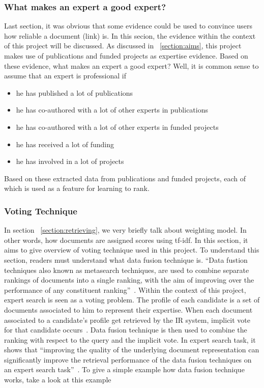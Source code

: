\subsubsection{What makes an expert a good expert?}\label{section:goodexpert}
Last section, it was obvious that some evidence could be used to convince users how reliable a document (link) is. In this secion, the evidence within
the context of this project will be discussed. As discussed in ~\ref{section:aims}, this project makes use of publications and funded projects as 
expertise evidence. Based on these evidence, what makes an expert a good expert? Well, it is common sense to assume that an expert is professional if 
\begin{itemize}
 \item he has published a lot of publications
 \item he has co-authored with a lot of other experts in publications
 \item he has co-authored with a lot of other experts in funded projects
 \item he has received a lot of funding
 \item he has involved in a lot of projects
\end{itemize}

Based on these extracted data from publications and funded projects, each of which is used as a feature for learning to rank.

\subsubsection{Voting Technique}\label{section:voting}
In section ~\ref{section:retrieving}, we very briefly talk about weighting model. In other words, how documents are assigned scores using tf-idf. In this section,
it aims to give overview of voting technique used in this project. To understand this section, readers must understand what data fusion technique is. 
``Data fustion techniques also known as metasearch techniques, are used to combine separate rankings of documents into a single ranking,
with the aim of improving over the performance of any constituent ranking''~\cite[P. 388]{expertsearch}. Within the context of this project, 
expert search is seen as a voting problem. The profile of each candidate is a set of documents associated to him to represent their expertise.
When each document associated to a candidate's profile get retrieved by the IR system, implicit vote for that candidate occurs~\cite[P. 389]{expertsearch}.
Data fusion technique is then used to combine the ranking with respect to the query and the implicit vote. In expert search task, it shows that 
``improving the quality of the underlying document representation can significantly improve the retrieval performance of the data fusion techniques 
on an expert search task''~\cite[P. 387]{expertsearch}. To give a simple example how data fusion technique works, take a look at this example


